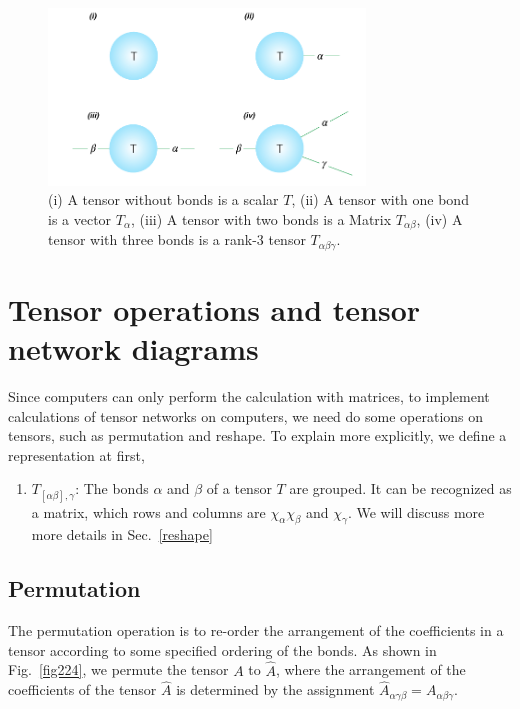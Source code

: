 \begin{figure}[ht]
	\centering
	\includegraphics[width=0.75\textwidth]{figures/fig211.png}
	\caption[The reprecentation of commen tensors.]{(i) A tensor without bonds is a scalar $T$, (ii) A tensor with one bond is a vector $T_{\alpha}$, (iii) A tensor with two bonds is a Matrix $T_{\alpha \beta}$, (iv) A tensor with three bonds is a rank-3 tensor $T_{\alpha \beta \gamma}$.}
	\label{fig211}
\end{figure}

\section{Tensor operations and tensor network diagrams} %
\label{operation}

Since computers can only perform the calculation with matrices, to implement calculations of tensor networks on computers, we need do some operations on tensors, such as permutation and reshape. To explain more explicitly, we define a representation at first,
\begin{enumerate}
	\item $T_{[\alpha \beta], \gamma}$: The bonds $\alpha$ and $\beta$ of a tensor $T$ are grouped. It can be recognized as a matrix, which rows and columns are $\chi_{\alpha}\chi_{\beta}$ and $\chi_{\gamma}$. We will discuss more more details in Sec.~\ref{reshape}
\end{enumerate}

\subsection{Permutation}

The permutation operation is to re-order the arrangement of the coefficients in a tensor according to some specified ordering of the bonds. As shown in Fig.~\ref{fig224}, we permute the tensor $A$ to $\hat{A}$, where the arrangement of the coefficients of the tensor $\hat{A}$ is determined by the assignment $\hat{A}_{\alpha \gamma \beta} = A_{\alpha \beta \gamma}$.

